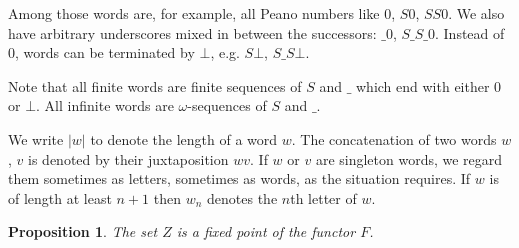 \documentclass[a4paper]{article}
\newtheorem{thmDomNuFisFixedPoint}[defNuF]{Proposition}
\begin{document}
Among those words are, for example, all Peano numbers like $0$, $S0$, $SS0$.
We also have arbitrary underscores mixed in between the successors: $\_0$,
$S\_S\_0$.  Instead of $0$, words can be terminated by $\bot$, e.g.  $S\bot$,
$S\_S\bot$.

Note that all finite words are finite sequences of $S$ and $\_$ which end with
either $0$ or $\bot$. All infinite words are $\omega$-sequences of $S$ and $\_$.

We write $|w|$ to denote the length of a word $w$.  The concatenation of two
words $w$, $v$ is denoted by their juxtaposition $wv$.  If $w$ or $v$ are
singleton words, we regard them sometimes as letters, sometimes as words, as the
situation requires.  If $w$ is of length at least $n+1$ then $w_n$ denotes the
$n$th letter of $w$.

\begin{thmDomNuFisFixedPoint}

The set $Z$ is a fixed point of the functor $F$.

\end{thmDomNuFisFixedPoint}
\end{document}
